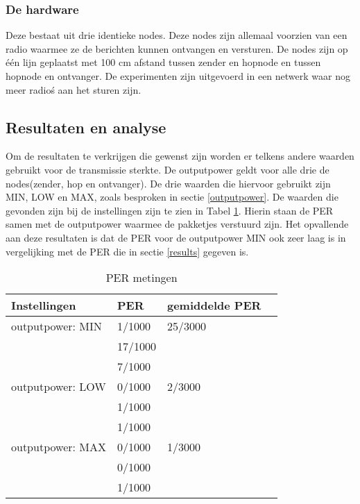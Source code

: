 \documentclass{article}
\begin{document}
\subsubsection{De hardware}

Deze bestaat uit drie identieke nodes. Deze nodes zijn allemaal voorzien van een radio waarmee ze de berichten kunnen ontvangen en versturen. De nodes zijn op \'e\'en lijn geplaatst met 100 cm afstand tussen zender en hopnode en tussen hopnode en ontvanger. De experimenten zijn uitgevoerd in een netwerk waar nog meer radio\'s aan het sturen zijn.
 
\subsection{Resultaten en analyse}

Om de resultaten te verkrijgen die gewenst zijn worden er telkens andere waarden gebruikt voor de transmissie sterkte.
De outputpower geldt voor alle drie de nodes(zender, hop en ontvanger). De drie waarden die hiervoor gebruikt zijn MIN, LOW en MAX, zoals besproken in sectie \ref{outputpower}. De waarden die gevonden zijn bij de instellingen zijn te zien in Tabel \ref{table:hopresults}. Hierin staan de PER samen met de outputpower waarmee de pakketjes verstuurd zijn. Het opvallende aan deze resultaten is dat de PER voor de outputpower MIN ook zeer laag is in vergelijking met de PER die in sectie \ref{results} gegeven is.

\begin{table}[h]
\centering \caption{PER metingen}
\label{table:hopresults}
    \begin{tabular}{ | l | l | l | p{5cm} |}
    \hline
    Instellingen 				& PER 		& gemiddelde PER\\ \hline
    outputpower: MIN 			& 1/1000 	& 25/3000		\\
    							& 17/1000 	& 				\\
   								& 7/1000	&  				\\ \hline
    outputpower: LOW 			& 0/1000 	& 2/3000		\\
    							& 1/1000 	& 				\\
   								& 1/1000	&  				\\ \hline
    outputpower: MAX 			& 0/1000 	& 1/3000		\\
    							& 0/1000 	& 				\\
   								& 1/1000	&  				\\ \hline
    \end{tabular}
\end{table}
\newpage
\end{document}

